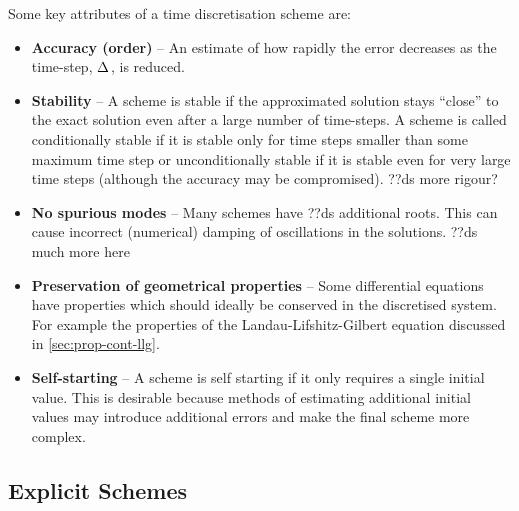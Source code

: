 Some key attributes of a time discretisation scheme are: \cite{Atkinson2009}
\begin{itemize}

\item \textbf{Accuracy (order)} -- An estimate of how rapidly the error decreases as the time-step, $\Delta_{}$, is reduced.

\item \textbf{Stability} -- A scheme is stable if the approximated solution stays ``close'' to the exact solution even after a large number of time-steps. 
A scheme is called conditionally stable if it is stable only for time steps smaller than some maximum time step or unconditionally stable if it is stable even for very large time steps (although the accuracy may be compromised). 
??ds more rigour?


\item \textbf{No spurious modes} -- Many schemes have ??ds additional roots.
This can cause incorrect (numerical) damping of oscillations in the solutions. 
??ds much more here

\item \textbf{Preservation of geometrical properties} -- Some differential equations have properties which should ideally be conserved in the discretised system. 
For example the properties of the Landau-Lifshitz-Gilbert equation discussed in \autoref{sec:prop-cont-llg}.

\item \textbf{Self-starting} -- A scheme is self starting if it only requires a single initial value.
This is desirable because methods of estimating additional initial values may introduce additional errors and make the final scheme more complex.
\end{itemize}

\subsection{Explicit Schemes}
\label{sec:explicit-schemes}

